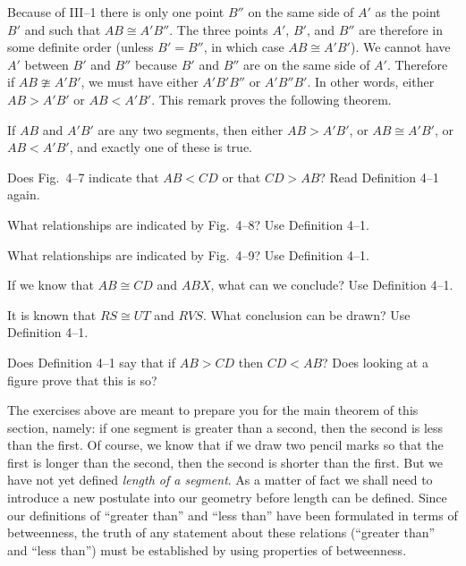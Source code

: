 \documentclass[11pt]{book}
\theoremstyle{bkplain}
\theoremstyle{XIplainnote}
\theoremstyle{bkplain}
\theoremstyle{bkplain}
\begin{document}
\FIGIVSIX

\begin{remark}
Because of III--1 there is only one point $B''$ on the same side of $A'$ as the
point $B'$ and such that $AB \cong A'B''$. The three points $A'$, $B'$, and
$B''$ are therefore in some definite order (unless $B' = B''$, in which case
$AB \cong A'B'$). We cannot have $A'$ between $B'$ and $B''$ because $B'$ and
$B''$ are on the same side of $A'$. Therefore if $AB \ncong A'B'$, we must have
either $A'B'B''$ or $A'B''B'$. In other words, either $AB > A'B'$ or
$AB < A'B'$. This remark proves the following theorem.
\end{remark}

\begin{theorem}
If $AB$ and $A'B'$ are any two segments, then either $AB > A'B'$, or
$AB \cong A'B'$, or $AB < A'B'$, and exactly one of these is true.
\end{theorem}


\begin{exercisecols}
\begin{exlist}
\item Does Fig.~4--7 indicate that $AB < CD$ or that $CD > AB$? Read
      Definition 4--1 again.
\exfig{\FIGIVSEVEN}
\item What relationships are indicated by Fig.~4--8? Use Definition 4--1.
\exfig{\FIGIVEIGHT}
\item What relationships are indicated by Fig.~4--9? Use Definition 4--1.
\exfig{\FIGIVNINE}
\item If we know that $AB \cong CD$ and $ABX$, what can we conclude? Use
      Definition 4--1.
\item It is known that $RS \cong UT$ and $RVS$. What conclusion can be drawn?
      Use Definition 4--1.
\item Does Definition 4--1 say that if $AB > CD$ then $CD < AB$? Does looking at
      a figure prove that this is so?
\end{exlist}
\end{exercisecols}

The exercises above are meant to prepare you for the main theorem of this
section, namely: if one segment is greater than a second, then the second is less
than the first. Of course, we know that if we draw two pencil marks so that the
first is longer than the second, then the second is shorter than the first. But
we have not yet defined \emph{length of a segment}. As a matter of fact we shall
need to introduce a new postulate into our geometry before length can be defined.
Since our definitions of ``greater than'' and ``less than'' have been formulated
in terms of betweenness, the truth of any statement about these relations
(``greater than'' and ``less than'') must be established by using properties of
betweenness.
\end{document}
